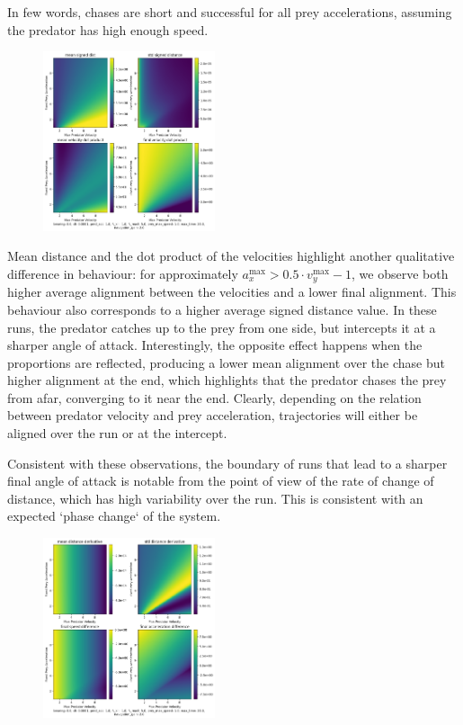 \documentclass[10pt, twocolumn]{article}
\begin{document}
          In few words, chases are short and successful for all prey accelerations, assuming the predator has high enough speed.

          \begin{figure}[H]
            \centering
            \includegraphics[width=0.45\textwidth]{figures/phase_avg_dist_dot.png}
            \label{fig:phaseplot2}
          \end{figure}

          Mean distance and the dot product of the velocities highlight another qualitative difference in behaviour: for approximately $a^{\text{max}}_x > 0.5\cdot v^{\text{max}}_y - 1$, we observe both higher average alignment between the velocities and a lower final alignment. This behaviour also corresponds to a higher average signed distance value. In these runs, the predator catches up to the prey from one side, but intercepts it at a sharper angle of attack. Interestingly, the opposite effect happens when the proportions are reflected, producing a lower mean alignment over the chase but higher alignment at the end, which highlights that the predator chases the prey from afar, converging to it near the end. Clearly, depending on the relation between predator velocity and prey acceleration, trajectories will either be aligned over the run or at the intercept.

          Consistent with these observations, the boundary of runs that lead to a sharper final angle of attack is notable from the point of view of the rate of change of distance, which has high variability over the run. This is consistent with an expected `phase change` of the system.

          \begin{figure}[H]
            \centering
            \includegraphics[width=0.45\textwidth]{figures/phase_derivative_dist.png}
            \label{fig:phaseplot3}
          \end{figure}
\end{document}

